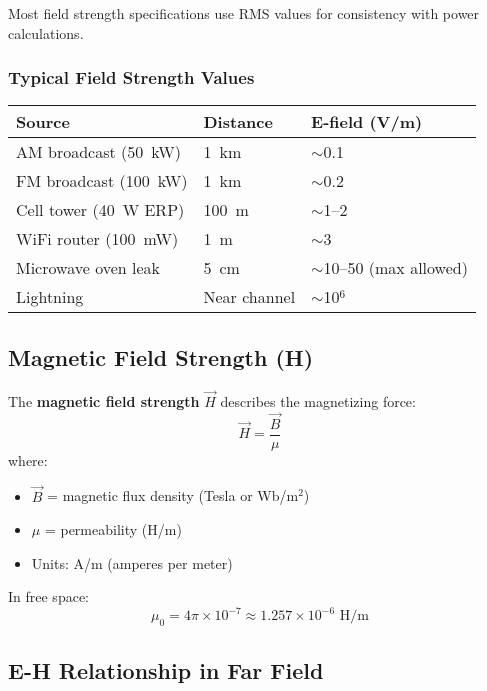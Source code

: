 Most field strength specifications use RMS values for consistency with power calculations.

\subsubsection{Typical Field Strength Values}

\begin{center}
\begin{tabular}{@{}lll@{}}
\toprule
Source & Distance & E-field (V/m) \\
\midrule
AM broadcast (50~kW) & 1~km & $\sim$0.1 \\
FM broadcast (100~kW) & 1~km & $\sim$0.2 \\
Cell tower (40~W ERP) & 100~m & $\sim$1--2 \\
WiFi router (100~mW) & 1~m & $\sim$3 \\
Microwave oven leak & 5~cm & $\sim$10--50 (max allowed) \\
Lightning & Near channel & $\sim$10$^6$ \\
\bottomrule
\end{tabular}
\end{center}

\subsection{Magnetic Field Strength (H)}

The \textbf{magnetic field strength} $\vec{H}$ describes the magnetizing force:
\begin{equation}
\vec{H} = \frac{\vec{B}}{\mu}
\label{eq:hfield-definition}
\end{equation}
where:
\begin{itemize}
\item $\vec{B}$ = magnetic flux density (Tesla or Wb/m$^2$)
\item $\mu$ = permeability (H/m)
\item Units: A/m (amperes per meter)
\end{itemize}

In free space:
\begin{equation}
\mu_0 = 4\pi \times 10^{-7} \approx 1.257 \times 10^{-6} \text{~H/m}
\label{eq:permeability-free-space}
\end{equation}

\subsection{E-H Relationship in Far Field}

